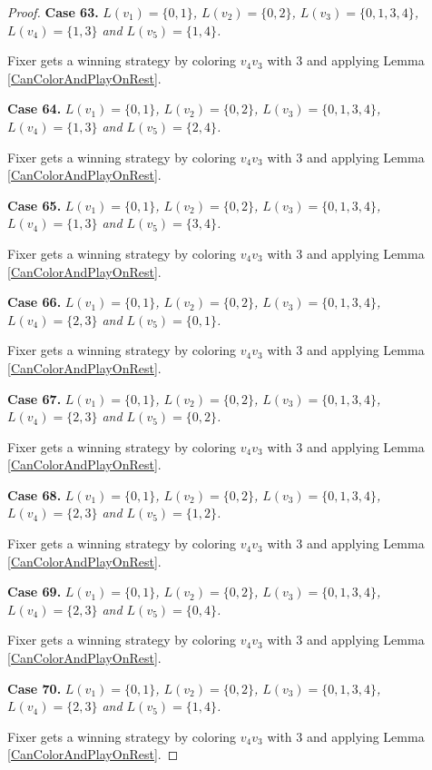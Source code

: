 \documentclass[12pt]{amsart}
\theoremstyle{plain}
\theoremstyle{definition}
\theoremstyle{remark}
\begin{document}
\begin{proof}
\noindent\textbf{Case 63.  }\textit{$L(v_1) = \{0, 1\}$, $L(v_2) = \{0, 2\}$, $L(v_3) = \{0, 1, 3, 4\}$, $L(v_4) = \{1, 3\}$ and $L(v_5) = \{1, 4\}$.}

Fixer gets a winning strategy by coloring $v_4v_3$ with $3$ and applying Lemma \ref{CanColorAndPlayOnRest}.

\noindent\textbf{Case 64.  }\textit{$L(v_1) = \{0, 1\}$, $L(v_2) = \{0, 2\}$, $L(v_3) = \{0, 1, 3, 4\}$, $L(v_4) = \{1, 3\}$ and $L(v_5) = \{2, 4\}$.}

Fixer gets a winning strategy by coloring $v_4v_3$ with $3$ and applying Lemma \ref{CanColorAndPlayOnRest}.

\noindent\textbf{Case 65.  }\textit{$L(v_1) = \{0, 1\}$, $L(v_2) = \{0, 2\}$, $L(v_3) = \{0, 1, 3, 4\}$, $L(v_4) = \{1, 3\}$ and $L(v_5) = \{3, 4\}$.}

Fixer gets a winning strategy by coloring $v_4v_3$ with $3$ and applying Lemma \ref{CanColorAndPlayOnRest}.

\noindent\textbf{Case 66.  }\textit{$L(v_1) = \{0, 1\}$, $L(v_2) = \{0, 2\}$, $L(v_3) = \{0, 1, 3, 4\}$, $L(v_4) = \{2, 3\}$ and $L(v_5) = \{0, 1\}$.}

Fixer gets a winning strategy by coloring $v_4v_3$ with $3$ and applying Lemma \ref{CanColorAndPlayOnRest}.

\noindent\textbf{Case 67.  }\textit{$L(v_1) = \{0, 1\}$, $L(v_2) = \{0, 2\}$, $L(v_3) = \{0, 1, 3, 4\}$, $L(v_4) = \{2, 3\}$ and $L(v_5) = \{0, 2\}$.}

Fixer gets a winning strategy by coloring $v_4v_3$ with $3$ and applying Lemma \ref{CanColorAndPlayOnRest}.

\noindent\textbf{Case 68.  }\textit{$L(v_1) = \{0, 1\}$, $L(v_2) = \{0, 2\}$, $L(v_3) = \{0, 1, 3, 4\}$, $L(v_4) = \{2, 3\}$ and $L(v_5) = \{1, 2\}$.}

Fixer gets a winning strategy by coloring $v_4v_3$ with $3$ and applying Lemma \ref{CanColorAndPlayOnRest}.

\noindent\textbf{Case 69.  }\textit{$L(v_1) = \{0, 1\}$, $L(v_2) = \{0, 2\}$, $L(v_3) = \{0, 1, 3, 4\}$, $L(v_4) = \{2, 3\}$ and $L(v_5) = \{0, 4\}$.}

Fixer gets a winning strategy by coloring $v_4v_3$ with $3$ and applying Lemma \ref{CanColorAndPlayOnRest}.

\noindent\textbf{Case 70.  }\textit{$L(v_1) = \{0, 1\}$, $L(v_2) = \{0, 2\}$, $L(v_3) = \{0, 1, 3, 4\}$, $L(v_4) = \{2, 3\}$ and $L(v_5) = \{1, 4\}$.}

Fixer gets a winning strategy by coloring $v_4v_3$ with $3$ and applying Lemma \ref{CanColorAndPlayOnRest}.


\end{proof}
\end{document}
